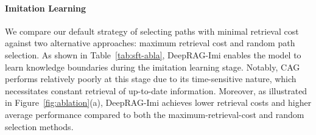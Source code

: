 % 


\paragraph{Imitation Learning}


\begin{table}[htbp]
  \centering
    \caption{Experiment results of the ablation study on the Imitation Learning Stage. ID refers to the average score of two in-distribution dataset HotpotQA and 2WikiMultihopQA.}
  \label{tab:sft-abla}%
\end{table}%


We compare our default strategy of selecting paths with minimal retrieval cost against two alternative approaches: maximum retrieval cost and random path selection.
% 
As shown in Table~\ref{tab:sft-abla}, DeepRAG-Imi enables the model to learn knowledge boundaries during the imitation learning stage. 
Notably, CAG performs relatively poorly at this stage due to its time-sensitive nature, which necessitates constant retrieval of up-to-date information. 
% 
Moreover, as illustrated in Figure~\ref{fig:ablation}(a), DeepRAG-Imi achieves lower retrieval costs and higher average performance compared to both the maximum-retrieval-cost and random selection methods.





